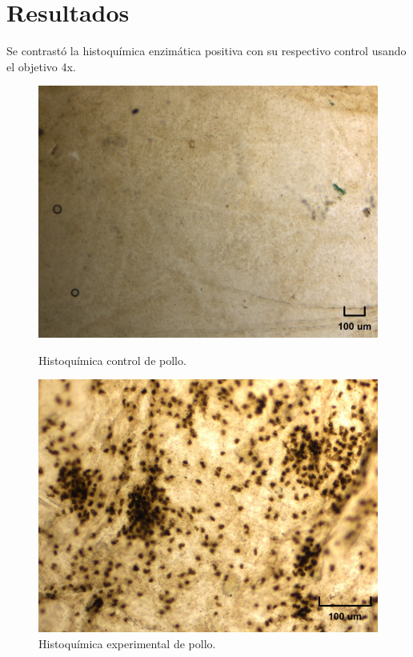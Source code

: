 \section*{Resultados}


Se contrastó la histoquímica enzimática positiva con su respectivo control usando el objetivo 4x.

\begin{figure}[h]
    \begin{minipage}[b]{0.225\textwidth}
        \centering
        \includegraphics[scale=0.26,frame]{atpControl.jpg}
        \caption{\small{Histoquímica control de pollo.}}
    \end{minipage}
    \hfill
    \begin{minipage}[b]{0.25\textwidth}
        \centering
        \includegraphics[scale=0.2725,frame]{atpExp.jpg}
        \caption{\small{Histoquímica experimental de pollo.}}
    \end{minipage}
\end{figure}

